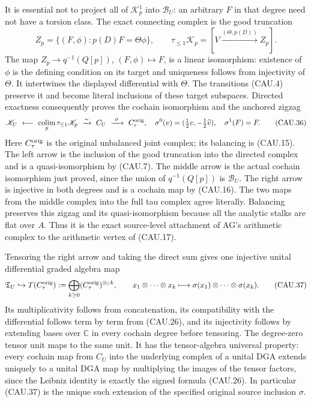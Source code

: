 It is essential not to project all of $\mathscr K_p^1$ into
$\mathscr B_U$: an arbitrary $F$ in that degree need not have a torsion
class.  The exact connecting complex is the good truncation
\[
 Z_p=\{(F,\phi):p(D)F=\Theta\phi\},\qquad
 \tau_{\le1}\mathscr K_p=[V\xrightarrow{(\Theta,p(D))}Z_p].    \tag{CAU.35}
\]
The map $Z_p\to q^{-1}(Q[p])$, $(F,\phi)\mapsto F$, is a linear
isomorphism: existence of $\phi$ is the defining condition on its
target and uniqueness follows from injectivity of $\Theta$.
It intertwines the displayed differential with $\Theta$.  The
transitions (CAU.4) preserve it and become literal inclusions of these
target subspaces.  Directed exactness consequently proves the cochain
isomorphism and the anchored zigzag
\[
 \mathscr K_U\ \longleftarrow\
       \mathop{\rm colim}_p\tau_{\le1}\mathscr K_p
       \ \xrightarrow{\sim}\ C_U
       \ \xrightarrow{\ \sigma\ }\ C_\tau^{\rm orig},
 \quad
 \sigma^0(v)=(\tfrac12v,-\tfrac12\widehat v),\quad
 \sigma^1(F)=F.                                              \tag{CAU.36}
\]
Here $C_\tau^{\rm orig}$ is the original unbalanced joint complex;
its balancing is (CAU.15).  The left arrow is the inclusion of the
good truncation into the directed complex and is a quasi-isomorphism
by (CAU.7).  The middle arrow is the actual cochain isomorphism just
proved, since the union of $q^{-1}(Q[p])$ is $\mathscr B_U$.
The right arrow is injective in both degrees and is a cochain map
by (CAU.16).  The two maps from the middle complex into the full
tau complex agree literally.  Balancing preserves this zigzag and
its quasi-isomorphism because all the analytic stalks are flat over
$A$.  Thus it is the exact source-level attachment of AG's arithmetic
complex to the arithmetic vertex of (CAU.17).

Tensoring the right arrow and taking the direct sum gives one injective
unital differential graded algebra map
\[
 \mathfrak T_U\hookrightarrow
       T(C_\tau^{\rm orig})
       :=\bigoplus_{k\ge0}(C_\tau^{\rm orig})^{\otimes_{\mathbb C}k},
 \qquad x_1\otimes\cdots\otimes x_k
        \longmapsto\sigma(x_1)\otimes\cdots\otimes\sigma(x_k).
                                                               \tag{CAU.37}
\]
Its multiplicativity follows from concatenation, its compatibility
with the differential follows term by term from (CAU.26), and its
injectivity follows by extending bases over $\mathbb C$ in every
cochain degree before tensoring.  The degree-zero tensor unit maps
to the same unit.  It has the tensor-algebra universal property:
every cochain map from $C_U$ into the underlying complex of a unital
DGA extends uniquely to a unital DGA map by multiplying the images
of the tensor factors, since the Leibniz identity is exactly the
signed formula (CAU.26).  In particular (CAU.37) is the unique such
extension of the specified original source inclusion $\sigma$.

